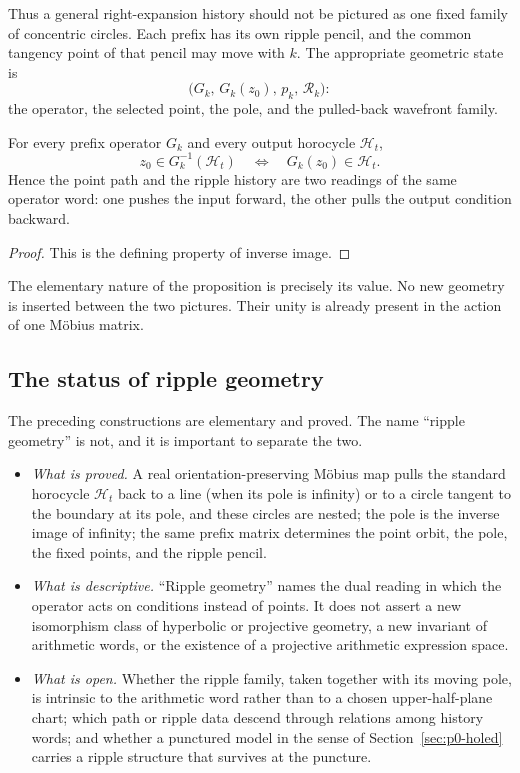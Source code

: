 Thus a general right-expansion history should not be pictured as one fixed
family of concentric circles.  Each prefix has its own ripple pencil, and the
common tangency point of that pencil may move with $k$.  The appropriate
geometric state is
\[
  \bigl(G_k,\,G_k(z_0),\,p_k,\,\mathcal R_k\bigr):
\]
the operator, the selected point, the pole, and the pulled-back wavefront
family.

\begin{proposition}
\label{prop:p0-path-ripple-duality}
For every prefix operator $G_k$ and every output horocycle $\mathcal H_t$,
\[
  z_0\in G_k^{-1}(\mathcal H_t)
  \quad\Longleftrightarrow\quad
  G_k(z_0)\in\mathcal H_t.
\]
Hence the point path and the ripple history are two readings of the same
operator word: one pushes the input forward, the other pulls the output
condition backward.
\end{proposition}

\begin{proof}
This is the defining property of inverse image.
\end{proof}

The elementary nature of the proposition is precisely its value.  No new
geometry is inserted between the two pictures.  Their unity is already present
in the action of one M\"obius matrix.



\subsection{The status of ripple geometry}
\label{subsec:p0-ripple-status}

The preceding constructions are elementary and proved.  The name
``ripple geometry'' is not, and it is important to separate the two.

\begin{itemize}
  \item \emph{What is proved.}  A real orientation-preserving M\"obius map
  pulls the standard horocycle $\mathcal H_t$ back to a line (when its pole is
  infinity) or to a circle tangent to the boundary at its pole, and these
  circles are nested; the pole is the inverse image of infinity; the same
  prefix matrix determines the point orbit, the pole, the fixed points, and the
  ripple pencil.
  \item \emph{What is descriptive.}  ``Ripple geometry'' names the dual reading
  in which the operator acts on conditions instead of points.  It does not
  assert a new isomorphism class of hyperbolic or projective geometry, a new
  invariant of arithmetic words, or the existence of a projective arithmetic
  expression space.
  \item \emph{What is open.}  Whether the ripple family, taken together with
  its moving pole, is intrinsic to the arithmetic word rather than to a chosen
  upper-half-plane chart; which path or ripple data descend through relations
  among history words; and whether a punctured model in the sense of
  Section~\ref{sec:p0-holed} carries a ripple structure that survives at the
  puncture.
\end{itemize}

